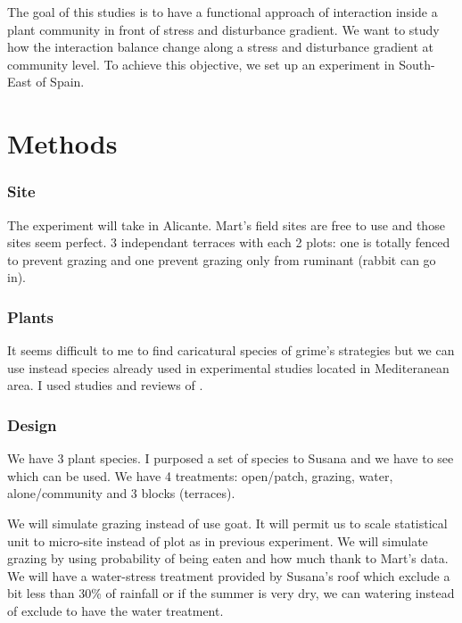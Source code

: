 \documentclass[12pt]{article} %
\begin{document}
The goal of this studies is to have a functional approach of interaction inside a plant community in front of stress and disturbance gradient. We want to study how the interaction balance change along a stress and disturbance gradient at community level. To achieve this objective, we set up an experiment in South-East of Spain.


\part{Methods}

\section{Site}

The experiment will take in Alicante. Mart's field sites are free to use and those sites seem perfect. 3 independant terraces with each 2 plots: one is totally fenced to prevent grazing and one prevent grazing only from ruminant (rabbit can go in). 

\section{Plants}

It seems difficult to me to find caricatural species of grime's strategies but we can use instead species already used in experimental studies located in Mediteranean area. I used studies and reviews of \citet{McCluney2012,Navarro2006, Jauffret2003}.



\section{Design}

We have 3 plant species. I purposed a set of species to Susana and we have to see which can be used. We have 4 treatments: open/patch, grazing, water, alone/community and 3 blocks (terraces).

 We will simulate grazing instead of use goat. It will permit us to scale statistical unit to micro-site instead of plot as in previous experiment. We will simulate grazing by using probability of being eaten and how much thank to Mart's data. 
We will have a water-stress treatment provided by Susana's roof which exclude a bit less than 30\% of rainfall or if the summer is very dry, we can watering instead of exclude to have the water treatment.
\end{document}
